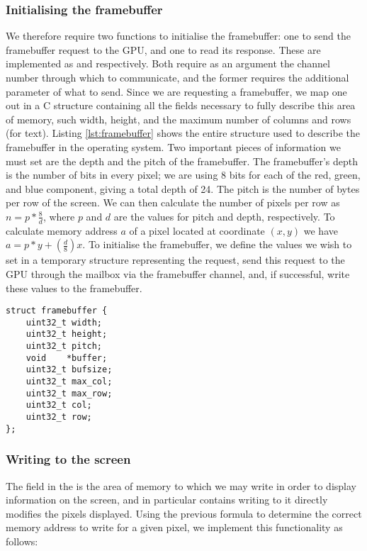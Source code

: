     \subsubsection{Initialising the framebuffer}
        We therefore require two functions to initialise the framebuffer: one to
        send the framebuffer request to the GPU, and one to read its response.
        These are implemented as  and
         respectively. Both require as an argument the
        channel number through which to communicate, and the former requires the
        additional parameter of what to send. Since we are requesting a
        framebuffer, we map one out in a C structure containing all the fields
        necessary to fully describe this area of memory, such width, height, and
        the maximum number of columns and rows (for text). Listing
        \ref{lst:framebuffer} shows the entire structure used to describe the
        framebuffer in the operating system. Two important pieces of information
        we must set are the depth and the pitch of the framebuffer. The
        framebuffer's depth is the number of bits in every pixel; we are using 8
        bits for each of the red, green, and blue component, giving a total
        depth of 24. The pitch is the number of bytes per row of the screen. We
        can then calculate the number of pixels per row as $n = p *
        \frac{8}{d}$, where $p$ and $d$ are the values for pitch and depth,
        respectively. To calculate memory address $a$ of a pixel located at
        coordinate $(x,y)$ we have $a = p * y + (\frac{d}{8}) x$. To initialise
        the framebuffer, we define the values we wish to set in a temporary
        structure representing the request, send this request to the GPU through
        the mailbox via the framebuffer channel, and, if successful, write these
        values to the framebuffer.

        \lstset{language=c}
        \begin{lstlisting}[caption={Structure representing the
        framebuffer},captionpos=b,label={lst:framebuffer}]
struct framebuffer {
    uint32_t width;
    uint32_t height;
    uint32_t pitch;
    void    *buffer;
    uint32_t bufsize;
    uint32_t max_col;
    uint32_t max_row;
    uint32_t col;
    uint32_t row;
};
        \end{lstlisting}

    \subsubsection{Writing to the screen}
        The field  in the  is the area of
        memory to which we may write in order to display information on the
        screen, and in particular contains writing to it directly modifies the
        pixels displayed. Using the previous formula to determine the correct
        memory address to write for a given pixel, we implement this
        functionality as follows:

